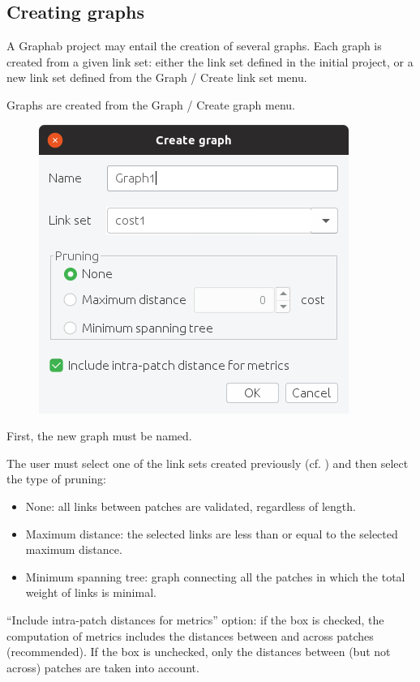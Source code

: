 \documentclass{article}
\begin{document}
\subsection{Creating graphs}

A Graphab project may entail the creation of several graphs. Each graph is created from a given link set: either the link set defined in the initial project, or a new link set defined from the Graph / Create link set menu.

Graphs are created from the Graph / Create graph menu. 

\begin{figure}[H]
	\includegraphics[scale=0.5]{img/manual-en_graph.png}
\end{figure}
	
First, the new graph must be named.

The user must select one of the link sets created previously (cf. ) and then select the type of pruning:
\begin{itemize}
	\item None: all links between patches are validated, regardless of length.
	\item Maximum distance: the selected links are less than or equal to the selected maximum distance.	
	\item Minimum spanning tree: graph connecting all the patches in which the total weight of links is minimal.
\end{itemize}

“Include intra-patch distances for metrics” option: if the box is checked, the computation of metrics includes the distances between and across patches (recommended). If the box is unchecked, only the distances between (but not across) patches are taken into account.
\end{document}
